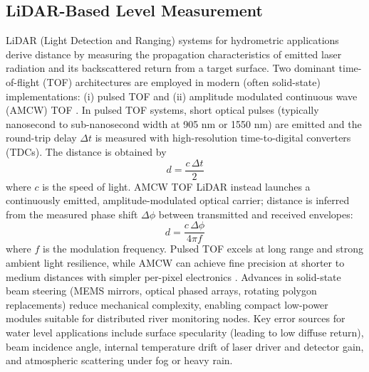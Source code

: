 \documentclass[conference]{IEEEtran}
\begin{document}
\subsection{LiDAR-Based Level Measurement}
LiDAR (Light Detection and Ranging) systems for hydrometric applications derive distance by measuring the propagation characteristics of emitted laser radiation and its backscattered return from a target surface. Two dominant time-of-flight (TOF) architectures are employed in modern (often solid-state) implementations: (i) pulsed TOF and (ii) amplitude modulated continuous wave (AMCW) TOF \cite{li_2022_a}. In pulsed TOF systems, short optical pulses (typically nanosecond to sub-nanosecond width at 905 nm or 1550 nm) are emitted and the round-trip delay \(\Delta t\) is measured with high-resolution time-to-digital converters (TDCs). The distance is obtained by
\begin{equation}
    d = \frac{c\,\Delta t}{2}
\end{equation}
where \(c\) is the speed of light. AMCW TOF LiDAR instead launches a continuously emitted, amplitude-modulated optical carrier; distance is inferred from the measured phase shift \(\Delta \phi\) between transmitted and received envelopes:
\begin{equation}
    d = \frac{c\,\Delta \phi}{4\pi f}
\end{equation}
where \(f\) is the modulation frequency. Pulsed TOF excels at long range and strong ambient light resilience, while AMCW can achieve fine precision at shorter to medium distances with simpler per-pixel electronics \cite{li_2022_a}. Advances in solid-state beam steering (MEMS mirrors, optical phased arrays, rotating polygon replacements) reduce mechanical complexity, enabling compact low-power modules suitable for distributed river monitoring nodes. Key error sources for water level applications include surface specularity (leading to low diffuse return), beam incidence angle, internal temperature drift of laser driver and detector gain, and atmospheric scattering under fog or heavy rain.
\end{document}
